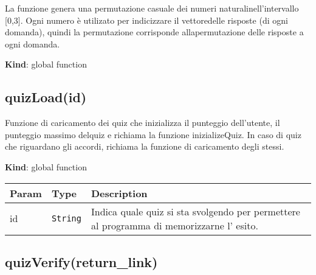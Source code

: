 La funzione genera una permutazione casuale dei numeri
naturalinell'intervallo {[}0,3{]}. Ogni numero è utilizato per
indicizzare il vettoredelle risposte (di ogni domanda), quindi la
permutazione corrisponde allapermutazione delle risposte a ogni domanda.

\textbf{Kind}: global function\\
\protect\hypertarget{quizLoad}{}{}

\hypertarget{quizloadid}{%
\subsection{quizLoad(id)}\label{quizloadid}}

Funzione di caricamento dei quiz che inizializza il punteggio
dell'utente, il punteggio massimo delquiz e richiama la funzione
inizializeQuiz. In caso di quiz che riguardano gli accordi, richiama la
funzione di caricamento degli stessi.

\textbf{Kind}: global function

\begin{tabularx}{\textwidth}{XXX}
\toprule
\begin{minipage}[b]{0.30\columnwidth}\raggedright
Param\strut
\end{minipage} & \begin{minipage}[b]{0.30\columnwidth}\raggedright
Type\strut
\end{minipage} & \begin{minipage}[b]{0.30\columnwidth}\raggedright
Description\strut
\end{minipage}\tabularnewline
\midrule
\endhead
\begin{minipage}[t]{0.30\columnwidth}\raggedright
id\strut
\end{minipage} & \begin{minipage}[t]{0.30\columnwidth}\raggedright
\texttt{String}\strut
\end{minipage} & \begin{minipage}[t]{0.30\columnwidth}\raggedright
Indica quale quiz si sta svolgendo per permettere al programma di
memorizzarne l' esito.\strut
\end{minipage}\tabularnewline
\bottomrule
\end{tabularx}

\protect\hypertarget{quizVerify}{}{}

\hypertarget{quizverifyreturn_link}{%
\subsection{quizVerify(return\_link)}\label{quizverifyreturn_link}}

